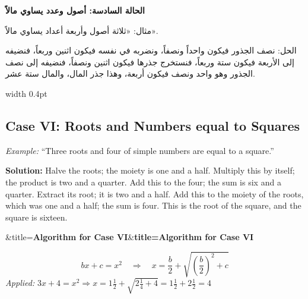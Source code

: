 \documentclass[11pt,a4paper]{book}
\newenvironment{mathbox}[1][]{%
  \smallskip\par\noindent
  \begin{lrbox}{\mathboxsave}
  \begin{minipage}{\dimexpr\linewidth-2\fboxsep-2\fboxrule\relax}%
  \setlength{\parskip}{0.3em}%
  \ifx&#1&\else\textbf{#1}\\[0.2cm]\fi
}{%
  \end{minipage}%
  \end{lrbox}
  \fcolorbox{sectioncolor}{mathbg}{\usebox{\mathboxsave}}%
  \smallskip}
\begin{document}
\newpage

\noindent\begin{minipage}[t]{0.48\textwidth}
\raggedleft

\begin{Arabic}
\textbf{الحالة السادسة: أصول وعدد يساوي مالاً}

مثال: «ثلاثة أصول وأربعة أعداد يساوي مالاً».

الحل: نصف الجذور فيكون واحداً ونصفاً، ونضربه في نفسه فيكون اثنين وربعاً، فنضيفه إلى الأربعة فيكون ستة وربعاً، فنستخرج جذرها فيكون اثنين ونصفاً، فنضيفه إلى نصف الجذور وهو واحد ونصف فيكون أربعة، وهذا جذر المال، والمال ستة عشر.
\end{Arabic}

\end{minipage}%
\hfill\vrule width 0.4pt\hfill
\begin{minipage}[t]{0.48\textwidth}
\raggedright

\subsection*{Case VI: Roots and Numbers equal to Squares}

\textit{Example:} ``Three roots and four of simple numbers are equal to a square.''

\textbf{Solution:} Halve the roots; the moiety is one and a half. Multiply this by itself; the product is two and a quarter. Add this to the four; the sum is six and a quarter. Extract its root; it is two and a half. Add this to the moiety of the roots, which was one and a half; the sum is four. This is the root of the square, and the square is sixteen.

\begin{mathbox}[title={\textbf{Algorithm for Case VI}}]
\begin{equation}
bx + c = x^2 \quad\Longrightarrow\quad x = \frac{b}{2} + \sqrt{\left(\frac{b}{2}\right)^2 + c}
\end{equation}
\textit{Applied:} $3x + 4 = x^2 \Rightarrow x = 1\tfrac{1}{2} + \sqrt{2\tfrac{1}{4} + 4} = 1\tfrac{1}{2} + 2\tfrac{1}{2} = 4$
\end{mathbox}

\end{minipage}
\vspace{0.3cm}

\newpage

\end{document}

